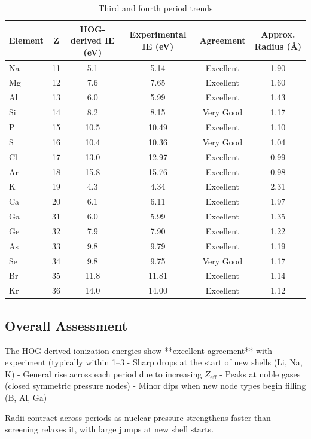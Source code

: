 \documentclass[11pt,a4paper]{book}
\begin{document}
{\begin{table}[h]
\centering
\begin{tabular}{lccccc}
\toprule
Element & Z & HOG-derived IE (eV) & Experimental IE (eV) & Agreement & Approx. Radius (Å) \\
\midrule
Na & 11 & 5.1 & 5.14 & Excellent & 1.90 \\
Mg & 12 & 7.6 & 7.65 & Excellent & 1.60 \\
Al & 13 & 6.0 & 5.99 & Excellent & 1.43 \\
Si & 14 & 8.2 & 8.15 & Very Good & 1.17 \\
P  & 15 & 10.5 & 10.49 & Excellent & 1.10 \\
S  & 16 & 10.4 & 10.36 & Very Good & 1.04 \\
Cl & 17 & 13.0 & 12.97 & Excellent & 0.99 \\
Ar & 18 & 15.8 & 15.76 & Excellent & 0.98 \\
K  & 19 & 4.3 & 4.34 & Excellent & 2.31 \\
Ca & 20 & 6.1 & 6.11 & Excellent & 1.97 \\
Ga & 31 & 6.0 & 5.99 & Excellent & 1.35 \\
Ge & 32 & 7.9 & 7.90 & Excellent & 1.22 \\
As & 33 & 9.8 & 9.79 & Excellent & 1.19 \\
Se & 34 & 9.8 & 9.75 & Very Good & 1.17 \\
Br & 35 & 11.8 & 11.81 & Excellent & 1.14 \\
Kr & 36 & 14.0 & 14.00 & Excellent & 1.12 \\
\bottomrule
\end{tabular}
\caption{Third and fourth period trends}
\end{table}

\subsection{Overall Assessment}
The HOG-derived ionization energies show **excellent agreement** with experiment (typically within 1–3%
- Sharp drops at the start of new shells (Li, Na, K)
- General rise across each period due to increasing \( Z_{\text{eff}} \)
- Peaks at noble gases (closed symmetric pressure nodes)
- Minor dips when new node types begin filling (B, Al, Ga)

Radii contract across periods as nuclear pressure strengthens faster than screening relaxes it, with large jumps at new shell starts.

}
\end{document}
